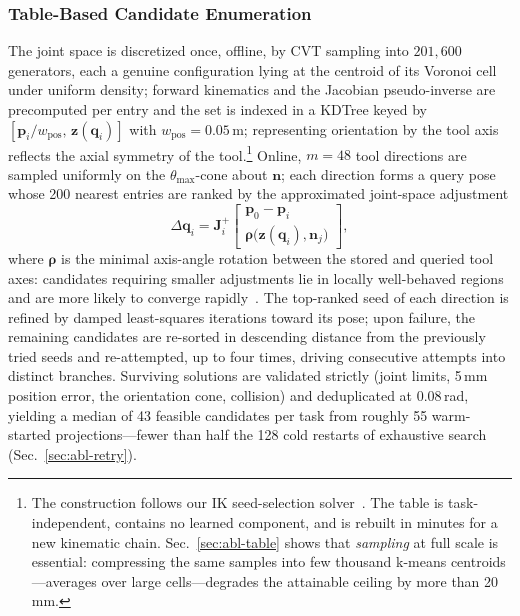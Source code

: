 \documentclass[journal]{IEEEtran}
\begin{document}
\subsubsection{Table-Based Candidate Enumeration}
The joint space is discretized once, offline, by CVT sampling into
$201{,}600$ generators, each a genuine configuration lying at the
centroid of its Voronoi cell under uniform density; forward kinematics
and the Jacobian pseudo-inverse are precomputed per entry and the set is
indexed in a KDTree keyed by
$[\mathbf{p}_i/w_{\mathrm{pos}},\,\mathbf{z}(\mathbf{q}_i)]$ with
$w_{\mathrm{pos}}{=}0.05$\,m; representing orientation by the tool axis
reflects the axial symmetry of the tool.\footnote{The construction
follows our IK seed-selection solver~\cite{yuan2026iksel}. The table is
task-independent, contains no learned component, and is rebuilt in
minutes for a new kinematic chain. Sec.~\ref{sec:abl-table} shows that
\textit{sampling} at full scale is essential: compressing the same
samples into few thousand k-means centroids---averages over large
cells---degrades the attainable ceiling by more than 20\,mm.} Online,
$m{=}48$ tool directions are sampled uniformly on the
$\theta_{\max}$-cone about $\mathbf{n}$; each direction forms a query
pose whose 200 nearest entries are ranked by the approximated
joint-space adjustment
\begin{equation}
\Delta\mathbf{q}_i=\mathbf{J}^{+}_i
\begin{bmatrix}\mathbf{p}_0-\mathbf{p}_i\\
\boldsymbol{\rho}\big(\mathbf{z}(\mathbf{q}_i),\mathbf{n}_j\big)
\end{bmatrix},
\label{eq:rank}
\end{equation}
where $\boldsymbol{\rho}$ is the minimal axis-angle rotation between the
stored and queried tool axes: candidates requiring smaller adjustments
lie in locally well-behaved regions and are more likely to converge
rapidly~\cite{yuan2026iksel}. The top-ranked seed of each direction is
refined by damped least-squares iterations toward its pose; upon
failure, the remaining candidates are re-sorted in descending distance
from the previously tried seeds and re-attempted, up to four times,
driving consecutive attempts into distinct branches. Surviving
solutions are validated strictly (joint limits, 5\,mm position error,
the orientation cone, collision) and deduplicated at $0.08$\,rad,
yielding a median of 43 feasible candidates per task from roughly 55
warm-started projections---fewer than half the 128 cold restarts of
exhaustive search (Sec.~\ref{sec:abl-retry}).
\end{document}
